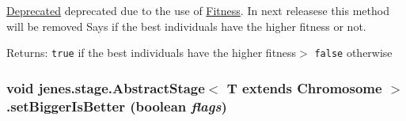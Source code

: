 \begin{Desc}
\item[\hyperlink{deprecated__deprecated000001}{Deprecated}]deprecated due to the use of \hyperlink{}{Fitness}. In next releasese this method will be removed Says if the best individuals have the higher fitness or not.\end{Desc}
\begin{Desc}
\item[Returns:]{\tt true} if the best individuals have the higher fitness$>$ {\tt false} otherwise \end{Desc}
\hypertarget{classjenes_1_1stage_1_1_abstract_stage_3_01_t_01extends_01_chromosome_01_4_dfddd6664c7f9f2eeba94d59de6fcebf}{
\subsubsection[setBiggerIsBetter]{\setlength{\rightskip}{0pt plus 5cm}void jenes.stage.AbstractStage$<$ T extends Chromosome $>$.setBiggerIsBetter (boolean {\em flags})}}
\label{classjenes_1_1stage_1_1_abstract_stage_3_01_t_01extends_01_chromosome_01_4_dfddd6664c7f9f2eeba94d59de6fcebf}


